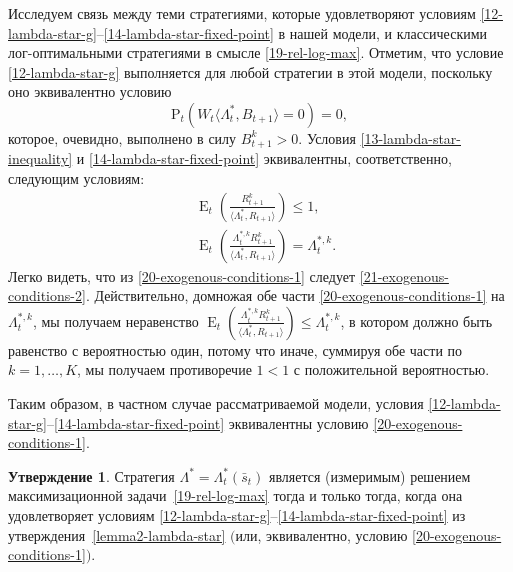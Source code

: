 \documentclass[a4paper,12pt,russian]{article} %
\theoremstyle{definition}
\newtheorem{proposition}{Утверждение}
\DeclareMathOperator{\E}{E}
\renewcommand{\P}{\mathrm{P}}
\begin{document}
Исследуем связь между теми стратегиями, которые удовлетворяют условиям \eqref{12-lambda-star-g}--\eqref{14-lambda-star-fixed-point} в нашей модели, и классическими лог-оптимальными стратегиями в смысле \eqref{19-rel-log-max}. 
Отметим, что условие \eqref{12-lambda-star-g} выполняется для любой стратегии в этой модели, поскольку оно эквивалентно условию
\[
\P_t(W_t \langle \Lambda_t^*, B_{t+1}\rangle = 0) = 0,
\]
которое, очевидно, выполнено в силу $B_{t+1}^k>0$. 
Условия \eqref{13-lambda-star-inequality} и \eqref{14-lambda-star-fixed-point} эквивалентны, соответственно, следующим условиям:
\begin{align}
\label{20-exogenous-conditions-1}
&\E_t\left(\frac{R_{t+1}^k}{\langle \Lambda_t^*, R_{t+1}\rangle}\right) \le 1, \\
\label{21-exogenous-conditions-2}
&\E_t\left(
  \frac{\Lambda_{t}^{*,k} R_{t+1}^k}{\langle \Lambda_t^*, R_{t+1}\rangle}
\right)
= \Lambda_{t}^{*,k}.
\end{align}
Легко видеть, что из \eqref{20-exogenous-conditions-1} следует \eqref{21-exogenous-conditions-2}.
Действительно, домножая обе части \eqref{20-exogenous-conditions-1} на $\Lambda_{t}^{*,k}$, мы получаем неравенство $\E_t\left(
  \frac{\Lambda_{t}^{*,k} R_{t+1}^k}{\langle \Lambda_t^*, R_{t+1}\rangle}
\right)
\le \Lambda_{t}^{*,k}$, в котором должно быть равенство с вероятностью один, потому что иначе, суммируя обе части по $k=1,\dots,K$, мы получаем противоречие $1<1$ с положительной вероятностью.


Таким образом, в частном случае рассматриваемой модели, условия \eqref{12-lambda-star-g}--\eqref{14-lambda-star-fixed-point} эквивалентны условию \eqref{20-exogenous-conditions-1}.

\begin{proposition}
\label{prop3-maximaize-logreturns}
 Стратегия $\Lambda^* = \Lambda^*_t(\bar s_t)$  является (измеримым) решением максимизационной задачи~\eqref{19-rel-log-max} тогда и только тогда, когда она удовлетворяет условиям \eqref{12-lambda-star-g}--\eqref{14-lambda-star-fixed-point} из утверждения~\ref{lemma2-lambda-star} $($или, эквивалентно, условию \eqref{20-exogenous-conditions-1}$)$.
\end{proposition}
\end{document}
